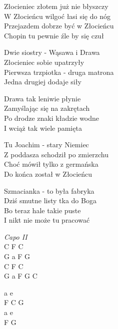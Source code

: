 \begin{text}
    \chordfill
    \vin Złocieniec złotem już nie błyszczy\\
    \vin W Złocieńcu wilgoć łasi się do nóg\\
    \vin Przejazdem dobrze być w Złocieńcu\\
    \vin Chopin tu pewnie źle by się czuł

    Dwie siostry - Wąsawa i Drawa\\
    Złocieniec sobie upatrzyły\\
    Pierwsza trzpiotka - druga matrona\\
    Jedna drugiej dodaje siły

    Drawa tak leniwie płynie\\
    Zamyślając się na zakrętach\\
    Po drodze znaki kładzie wodne\\
    I wciąż tak wiele pamięta

    Tu Joachim - stary Niemiec\\
    Z poddasza schodził po zmierzchu\\
    Choć mówił tylko z germańska\\
    Do końca został w Złocieńcu

    Szmacianka - to była fabryka\\
    Dziś smutne listy tka do Boga\\
    Bo teraz hale takie puste\\
    I nikt nie może tu pracować
\end{text}
\begin{chord}
    \textit{Capo II}\\
    C F C\\
    G a F G\\
    C F C\\
    G a F G C

    a e\\
    F C G\\
    a e\\
    F G
\end{chord}